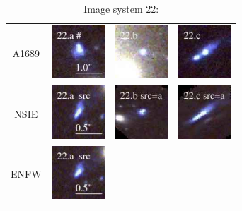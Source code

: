 \documentclass[useAMS,usenatbib]{mn2e}
\begin{document}
\begin{table}
  \caption{Image system 22:}\vspace{0mm}
  \begin{tabular}{cccc}
    \multicolumn{1}{m{1cm}}{{\Large A1689}}
    & \multicolumn{1}{m{1.7cm}}{\includegraphics[height=2.00cm,clip]{figs/nsie_img/rgb.img_22_a.ps}}
    & \multicolumn{1}{m{1.7cm}}{\includegraphics[height=2.00cm,clip]{figs/nsie_img/rgb.img_22_b.ps}}
    & \multicolumn{1}{m{1.7cm}}{\includegraphics[height=2.00cm,clip]{figs/nsie_img/rgb.img_22_c.ps}} \\
    \multicolumn{1}{m{1cm}}{{\Large NSIE}}
    & \multicolumn{1}{m{1.7cm}}{\includegraphics[height=2.00cm,clip]{figs/nsie_img/rgb.src_22_a.ps}}
    & \multicolumn{1}{m{1.7cm}}{\includegraphics[height=2.00cm,clip]{figs/nsie_img/rgb.pre_22_b_a_tri.ps}}
    & \multicolumn{1}{m{1.7cm}}{\includegraphics[height=2.00cm,clip]{figs/nsie_img/rgb.pre_22_c_a_tri.ps}} \\
    \multicolumn{1}{m{1cm}}{{\Large ENFW}}
    & \multicolumn{1}{m{1.7cm}}{\includegraphics[height=2.00cm,clip]{figs/enfw_img/rgb.src_22_a.ps}}

\end{tabular}
\end{table}
\end{document}
